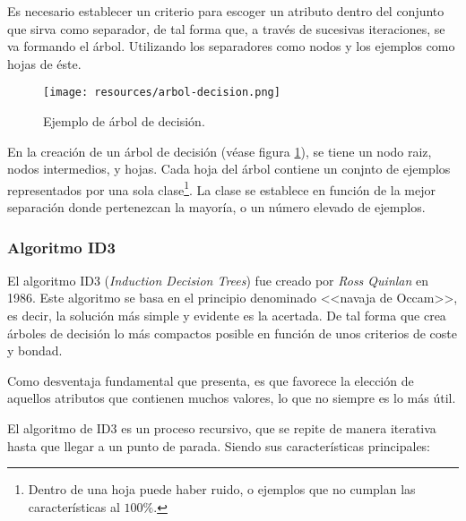 \documentclass[a4paper, 11pt, titlepage]{article}
\begin{document}
\begin{itemize}
                Es necesario establecer un criterio para escoger un atributo dentro del conjunto que sirva como 
                separador, de tal forma que, a través de sucesivas iteraciones, se va formando el árbol. 
                Utilizando los separadores como nodos y los ejemplos como hojas de éste.

                \begin{figure}[htp]
                    \centering
                    \texttt{[image: resources/arbol-decision.png]}
                    \caption{Ejemplo de árbol de decisión.}
                    \label{arboldecision}
                \end{figure}    
        
                En la creación de un árbol de decisión (véase figura \ref{arboldecision}), se tiene un 
                nodo raiz, nodos intermedios, y hojas. Cada hoja del árbol contiene un conjnto de ejemplos 
                representados por una sola clase\footnote{
                    Dentro de una hoja puede haber ruido, o ejemplos que no cumplan las características 
                    al $100\%$.
                }. La clase se establece en función de la mejor separación donde pertenezcan la mayoría, 
                o un número elevado de ejemplos.

            \end{itemize}

        \subsubsection{Algoritmo ID3}

            El algoritmo ID3 (\textit{Induction Decision Trees}) fue creado por \textit{Ross Quinlan} en 
            1986. Este algoritmo se basa en el principio denominado <<navaja de Occam>>, es decir, la solución 
            más simple y evidente es la acertada. De tal forma que crea árboles de decisión lo más compactos 
            posible en función de unos criterios de coste y bondad.

            Como desventaja fundamental que presenta, es que favorece la elección de aquellos atributos que contienen 
            muchos valores, lo que no siempre es lo más útil.

            El algoritmo de ID3 es un proceso recursivo, que se repite de manera iterativa hasta que llegar a un punto 
            de parada. Siendo sus características principales:
\end{document}
